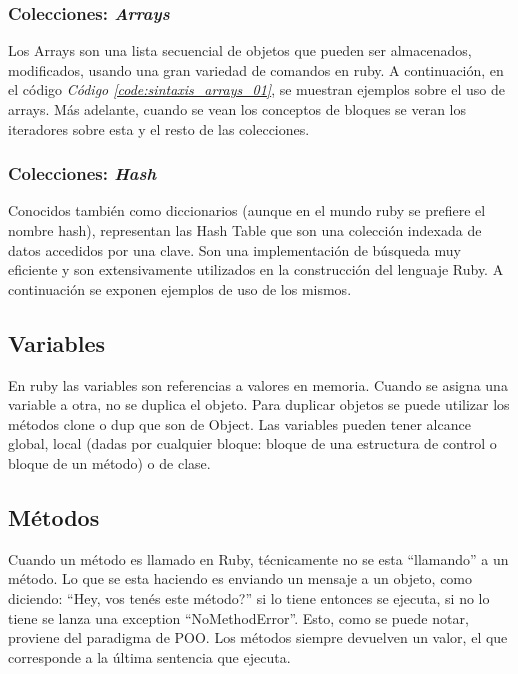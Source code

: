 \documentclass{article}
\newcommand{\refcode}[1]{\textit{Código \ref{#1}}}
\begin{document}
\subsubsection{Colecciones: \textit{Arrays}}
Los Arrays son una lista secuencial de objetos que pueden ser almacenados,  modificados,  usando una gran variedad de comandos en ruby.  
A continuación, en el código \refcode{code:sintaxis_arrays_01}, se muestran ejemplos sobre el uso de arrays. Más adelante, cuando se vean los conceptos de bloques se veran los iteradores sobre esta y el resto de las colecciones.

 
\bigskip

\subsubsection{Colecciones: \textit{Hash}}
Conocidos también como diccionarios (aunque en el mundo ruby se prefiere el nombre hash), representan las Hash Table que son una colección indexada de datos accedidos por una clave. Son una implementación de búsqueda muy eficiente y son extensivamente utilizados en la construcción del lenguaje Ruby. A continuación se exponen ejemplos de uso de los mismos.

 
\bigskip


\subsection{Variables}
En ruby las variables son referencias a valores en memoria. Cuando se asigna una variable a otra, no se duplica el objeto. Para duplicar objetos se puede utilizar los métodos clone o dup que son de Object.
Las variables pueden tener alcance global, local (dadas por cualquier bloque: bloque de una estructura de control o bloque de un método) o de clase.

 
\bigskip


\subsection{Métodos}

Cuando un método es llamado en Ruby, técnicamente no se esta “llamando” a un método. Lo que se esta haciendo es enviando un mensaje a un objeto, como diciendo: “Hey, vos tenés este método?” si lo tiene entonces se ejecuta, si no lo tiene se lanza una exception “NoMethodError”. Esto, como se puede notar, proviene del paradigma de POO.
Los métodos siempre devuelven un valor, el que corresponde a la última sentencia que ejecuta. 
\end{document}
